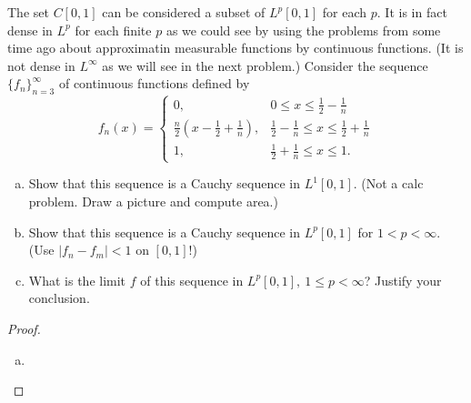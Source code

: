 \begin{pblm}%
	The set $C[0,1]$ can be considered a subset of $L^p[0,1]$ for each $p$. It is in 
	fact dense in $L^p$ for each finite $p$ as we could see by using the problems from 
	some time ago about approximatin measurable functions by continuous functions. (It 
	is not dense in $L^\infty$ as we will see in the next problem.) Consider the sequence 
	$\{f_n\}_{n=3}^\infty$ of continuous functions defined by 
	\begin{equation*}
		f_n(x) = \left\{
		\begin{matrix}
		0, & 0 \le x \le \frac{1}{2} - \frac{1}{n}\\
		\frac{n}{2}\left(x - \frac{1}{2} + \frac{1}{n}\right), & \frac{1}{2} - \frac{1}{n} \le x \le \frac{1}{2} + \frac{1}{n}\\
		1, & \frac{1}{2} + \frac{1}{n} \le x \le 1.
		\end{matrix}
		\right.
	\end{equation*}
	\begin{enumerate}[(a)]
		\item Show that this sequence is a Cauchy sequence in $L^1[0,1]$. (Not a 
			calc problem. Draw a picture and compute area.)
		\item Show that this sequence is a Cauchy sequence in $L^p[0,1]$ for $1 < p < \infty$. 
			(Use $|f_n - f_m| < 1$ on $[0,1]$!)
		\item What is the limit $f$ of this sequence in $L^p[0,1],~1\le p<\infty$? 
			Justify your conclusion. 
	\end{enumerate}
\begin{proof}
	\begin{center}
	\end{center}
	\begin{enumerate}[(a)]
		\item 
	\end{enumerate}
\end{proof}
\end{pblm}

